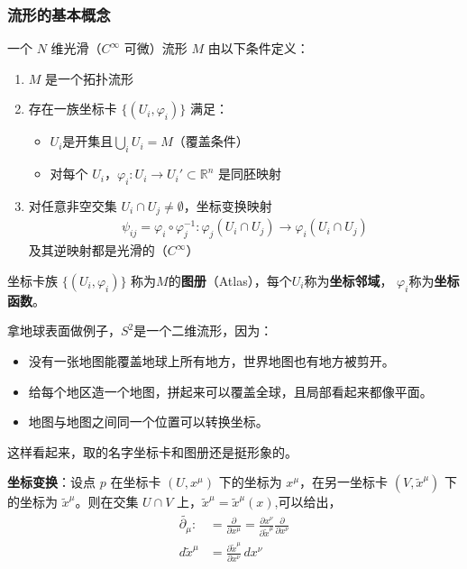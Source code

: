     \subsubsection{流形的基本概念}
    \begin{definition}[光滑流形]
一个 $N$ 维光滑（$C^\infty$ 可微）流形 $M$ 由以下条件定义：
\begin{enumerate}[label=(\arabic*)]
    \item $M$ 是一个拓扑流形
    \item 存在一族坐标卡 $\{(U_i, \varphi_i)\}$ 满足：
    \begin{itemize}
        \item $U_i$是开集且$\bigcup_i U_i = M$（覆盖条件）
        \item 对每个 $U_i$，$\varphi_i: U_i \to U_i' \subset \mathbb{R}^n$ 是同胚映射
    \end{itemize}
    \item 对任意非空交集 $U_i \cap U_j \neq \emptyset$，坐标变换映射
    \begin{align}
        \psi_{ij} = \varphi_i \circ \varphi_j^{-1}: \varphi_j(U_i \cap U_j) \to \varphi_i(U_i \cap U_j)
    \end{align}
    及其逆映射都是光滑的（$C^\infty$）
\end{enumerate}
\end{definition}
坐标卡族 $\{(U_i, \varphi_i)\}$ 称为$M$的\textbf{图册}（Atlas），每个$U_i$称为\textbf{坐标邻域}，
$\varphi_i$称为\textbf{坐标函数}。


\begin{example}[二维球面$S^2$]
拿地球表面做例子，$S^2$是一个二维流形，因为：
\begin{itemize}
    \item 没有一张地图能覆盖地球上所有地方，世界地图也有地方被剪开。
    \item 给每个地区造一个地图，拼起来可以覆盖全球，且局部看起来都像平面。
    \item 地图与地图之间同一个位置可以转换坐标。
\end{itemize}
这样看起来，取的名字坐标卡和图册还是挺形象的。
\end{example}
\textbf{坐标变换}：设点 $p$ 在坐标卡 $(U, x^\mu)$ 下的坐标为 $x^\mu$，在另一坐标卡 $(V, \widetilde x^\mu)$ 下的坐标为 $\widetilde x^\mu$。则在交集 $U \cap V$ 上，$\widetilde x^\mu = \widetilde x^\mu(x)$,可以给出，
\begin{align}
  \widetilde{\partial_\mu} :&= \frac{\partial}{\partial x^\mu} = \frac{\partial x^\nu}{\partial \widetilde x^\mu} \frac{\partial}{\partial x^\nu}\\
  d\widetilde x^\mu &= \frac{\partial \widetilde x^\mu}{\partial x^\nu} \, dx^\nu
\end{align}

